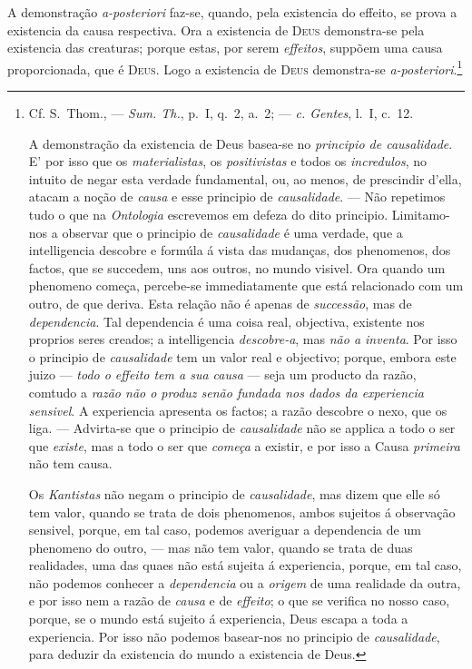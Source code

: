 A demonstração \emph{a-posteriori} faz-se, quando, pela existencia do effeito,
 se prova a existencia da causa respectiva. Ora a existencia de \textsc{Deus}
demonstra-se pela existencia das creaturas; porque estas, por serem \emph{effeitos},
suppõem uma causa proporcionada, que é \textsc{Deus}. Logo a existencia de
\textsc{Deus} demonstra-se \emph{a-posteriori}.\footnote{Cf. S.~Thom., --- \emph{Sum. Th.}, p.~I, q.~2, a.~2; --- \emph{c. Gentes}, l.~I,
c.~12.

A demonstração da existencia de Deus basea-se no \emph{principio de causalidade}. E'
por isso que os \emph{materialistas}, os \emph{positivistas} e todos os
\emph{incredulos}, no intuito de negar esta verdade fundamental, ou, ao menos, de
prescindir d'ella, atacam a noção de \emph{causa} e esse principio de
\emph{causalidade}. --- Não repetimos tudo o que na \emph{Ontologia} escrevemos em
defeza do dito principio. Limitamo-nos a observar que o principio de
\emph{causalidade} é uma verdade, que a intelligencia descobre e formúla á vista das
mudanças, dos phenomenos, dos factos, que se succedem, uns aos outros, no mundo
visivel. Ora quando um phenomeno começa, percebe-se immediatamente que está relacionado
com um outro, de que deriva. Esta relação não é apenas de \emph{successão}, mas de
\emph{dependencia}. Tal dependencia é uma coisa real, objectiva, existente nos proprios
seres creados; a intelligencia \emph{descobre-a}, mas \emph{não a inventa}. Por isso o
principio de \emph{causalidade} tem un valor real e objectivo; porque, embora este
juizo --- \emph{todo o effeito tem a sua causa} --- seja um producto da razão, comtudo a
\emph{razão não o produz senão fundada nos dados da experiencia sensivel}. A
experiencia apresenta os factos; a razão descobre o nexo, que os liga. ---
Advirta-se que o principio de \emph{causalidade} não se applica a todo o ser que
\emph{existe}, mas a todo o ser que \emph{começa} a existir, e por isso a Causa
\emph{primeira} não tem causa.

Os \emph{Kantistas} não negam o principio de \emph{causalidade}, mas dizem que elle só
tem valor, quando se trata de dois phenomenos, ambos sujeitos á observação sensivel,
porque, em tal caso, podemos averiguar a dependencia de um phenomeno do outro, --- mas
não tem valor, quando se trata de duas realidades, uma das quaes não está sujeita á
experiencia, porque, em tal caso, não podemos conhecer a \emph{dependencia} ou a
\emph{origem} de uma realidade da outra, e por isso nem a razão de \emph{causa} e de
\emph{effeito}; o que se verifica no nosso caso, porque, se o mundo está sujeito á
experiencia, Deus escapa a toda a experiencia. Por isso não podemos basear-nos no
principio de \emph{causalidade}, para deduzir da existencia do mundo a existencia de
Deus.

}
